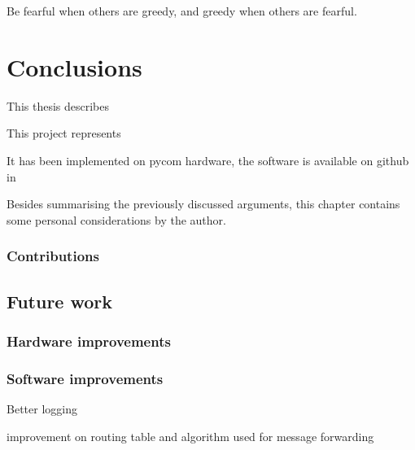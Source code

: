 
\begin{savequote}[70mm]
	Be fearful when others are greedy, and greedy when others are fearful.
\end{savequote}

\chapter{Conclusions}\label{chapter:conclusions}

	This thesis describes 
	
	This project represents
	
	It has been implemented on pycom hardware, the software is available on github in 
	
	Besides summarising the previously discussed arguments, this chapter contains some personal considerations by the author.

	\subsection{Contributions}
	
		

	\section{Future work}
	
		\subsection{Hardware improvements}
			

		\subsection{Software improvements}
		
			Better logging 
			
			improvement on routing table and algorithm used for message forwarding 

